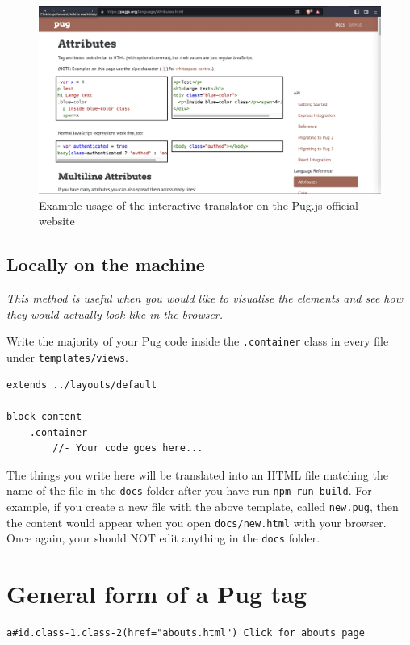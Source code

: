 \begin{figure}[h]
\centering
\includegraphics[width=13cm]{images/ch5-puginteractive.png}
\caption{Example usage of the interactive translator on the Pug.js official website}
\end{figure}

\subsection*{Locally on the machine}

\textit{This method is useful when you would like to visualise the elements and see how they would actually look like in the browser.}

Write the majority of your Pug code inside the \texttt{.container} class in every file under \texttt{templates/views}. 

\begin{lstlisting}[language=pug]
extends ../layouts/default

block content
	.container
		//- Your code goes here...
\end{lstlisting}

The things you write here will be translated into an HTML file matching the name of the file in the \texttt{docs} folder after you have run \texttt{npm run build}. For example, if you create a new file with the above template, called \texttt{new.pug}, then the content would appear when you open \texttt{docs/new.html} with your browser. Once again, your should NOT edit anything in the \texttt{docs} folder.

\section{General form of a Pug tag}

\begin{lstlisting}[language=pug]
a#id.class-1.class-2(href="abouts.html") Click for abouts page
\end{lstlisting}

